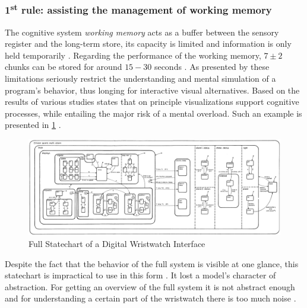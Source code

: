 \subsubsection{1\textsuperscript{st} rule: assisting the management of working memory}
The cognitive system \emph{working memory} acts as a buffer between the sensory register and the long-term store, its capacity is limited and information is only held temporarily \autocite{herczeg_software-ergonomie_2018}.
Regarding the performance of the working memory, $7 \pm 2$ chunks can be stored for around $15-30$ seconds \autocite{herczeg_software-ergonomie_2018}.
As presented by \textcite{victor_inventing_2012} these limitations seriously restrict the understanding and mental simulation of a program's behavior, thus longing for interactive visual alternatives.
Based on the results of various studies \textcite{dutke_mentale_1994} states that on principle visualizations support cognitive processes, while entailing the major risk of a mental overload.
Such an example is presented in \cref{fig:full-wristwatch-statechart} \autocite{harel_statecharts:_1987}.
\begin{figure}[h]
\centering
\includegraphics[width=\textwidth]{images/full-watch-statechart}
\caption{Full Statechart of a Digital Wristwatch Interface}
\label{fig:full-wristwatch-statechart}
\end{figure}
Despite the fact that the behavior of the full system is visible at one glance, this statechart is impractical to use in this form \autocite{harel_statecharts:_1987}.
It lost a model's character of abstraction.
For getting an overview of the full system it is not abstract enough and for understanding a certain part of the wristwatch there is too much noise \autocite{dutke_mentale_1994}.

